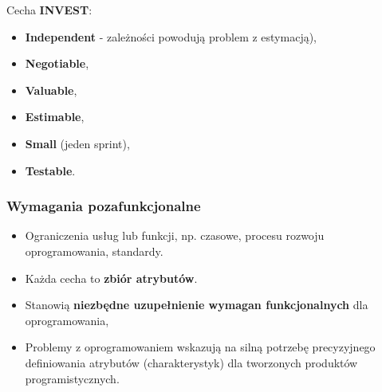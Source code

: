 \documentclass[a4paper]{article}
\begin{document}
    Cecha \textbf{INVEST}:
    \begin{itemize}
        \item \textbf{Independent} - zależności powodują problem z estymacją),
        \item \textbf{Negotiable},
        \item \textbf{Valuable},
        \item \textbf{Estimable},
        \item \textbf{Small} (jeden sprint),
        \item \textbf{Testable}.
    \end{itemize}

    \subsubsection{Wymagania pozafunkcjonalne}
    \begin{itemize}
        \item Ograniczenia usług lub funkcji, np. czasowe, procesu rozwoju oprogramowania, standardy.
        \item Każda cecha to \textbf{zbiór atrybutów}.
        \item Stanowią \textbf{niezbędne uzupełnienie wymagan funkcjonalnych} dla oprogramowania,
        \item Problemy z oprogramowaniem wskazują na silną potrzebę precyzyjnego definiowania atrybutów
        (charakterystyk) dla tworzonych produktów programistycznych.
    \end{itemize}
\end{document}
